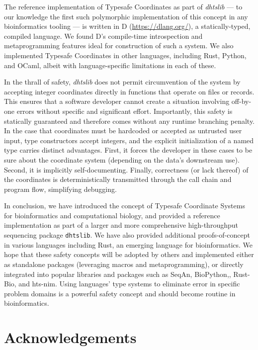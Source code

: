 \documentclass[12pt]{article}
\begin{document}
The reference implementation of Typesafe Coordinates as part of \textit{dhtslib}\cite{gregory_dhtslib_nodate} --- to our knowledge the first such polymorphic implementation of this concept in any bioinformatics tooling --- is written in D (\url{https://dlang.org/}), a statically-typed, compiled language. We found D's compile-time introspection and metaprogramming features ideal for construction of such a system. We also implemented Typesafe Coordinates in other languages, including Rust, Python, and OCaml, albeit with language-specific limitations in each of these.

In the thrall of safety, \textit{dhtslib} does not permit circumvention of the system by accepting integer coordinates directly in functions that operate on files or records. This ensures that a software developer cannot create a situation involving off-by-one errors without specific and significant effort. Importantly, this safety is statically guaranteed and therefore comes without any runtime branching penalty. In the case that coordinates must be hardcoded or accepted as untrusted user input, type constructors accept integers, and the explicit initialization of a named type carries distinct advantages. First, it forces the developer in these cases to be sure about the coordinate system (depending on the data’s downstream use). Second, it is implicitly self-documenting. Finally, correctness (or lack thereof) of the coordinates is deterministically transmitted through the call chain and program flow, simplifying debugging.

In conclusion, we have introduced the concept of Typesafe Coordinate Systems for bioinformatics and computational biology, and provided a reference implementation as part of a larger and more comprehensive high-throughput sequencing package \texttt{dhtslib}. We have also provided additional proofs-of-concept in various languages including Rust, an emerging language for bioinformatics. We hope that these safety concepts will be adopted by others and implemented either as standalone packages (leveraging macros and metaprogramming), or directly integrated into popular libraries and packages such as SeqAn,\cite{reinert_seqan_2017} BioPython,\cite{cock_biopython_2009}, Rust-Bio,\cite{koster_rust-bio_2016} and hts-nim.\cite{pedersen_hts-nim_2018} Using languages' type systems to eliminate error in specific problem domains is a powerful safety concept and should become routine in bioinformatics.



\section*{Acknowledgements} %
\end{document}
